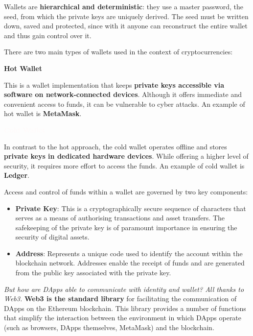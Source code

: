 Wallets are \textbf{hierarchical and deterministic}: they use a master password, the seed, from which the private keys are uniquely derived. The seed must be written down, saved and protected, since with it anyone can reconstruct the entire wallet and thus gain control over it.

There are two main types of wallets used in the context of cryptocurrencies:

\textbf{\textcolor{Hot}{Hot Wallet \faHotjar}} 

This is a wallet implementation that keeps \textbf{private keys accessible via software on network-connected devices}. Although it offers immediate and convenient access to funds, it can be vulnerable to cyber attacks. An example of hot wallet is \textbf{MetaMask}.
    
\textbf{\textcolor{Snow}{Cold Wallet \faSnowflake}} 

In contrast to the hot approach, the cold wallet operates offline and stores \textbf{private keys in dedicated hardware devices}. While offering a higher level of security, it requires more effort to access the funds. An example of cold wallet is \textbf{Ledger}.

Access and control of funds within a wallet are governed by two key components:

\begin{itemize}
    \item \textbf{Private Key}: This is a cryptographically secure sequence of characters that serves as a means of authorising transactions and asset transfers. The safekeeping of the private key is of paramount importance in ensuring the security of digital assets.
    
    \item \textbf{Address}: Represents a unique code used to identify the account within the blockchain network. Addresses enable the receipt of funds and are generated from the public key associated with the private key.
\end{itemize}

\textit{But how are DApps able to communicate with identity and wallet? All thanks to Web3.} \textbf{Web3 is the standard library} for facilitating the communication of DApps on the Ethereum blockchain. This library provides a number of functions that simplify the interaction between the environment in which DApps operate (such as browsers, DApps themselves, MetaMask) and the blockchain.
